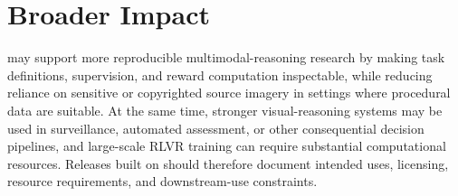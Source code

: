 \section*{Broader Impact}

\trace may support more reproducible multimodal-reasoning research by making
task definitions, supervision, and reward computation inspectable, while reducing
reliance on sensitive or copyrighted source imagery in settings where procedural
data are suitable. At the same time, stronger visual-reasoning systems may be
used in surveillance, automated assessment, or other consequential decision
pipelines, and large-scale RLVR training can require substantial computational
resources. Releases built on \trace should therefore document intended uses,
licensing, resource requirements, and downstream-use constraints.